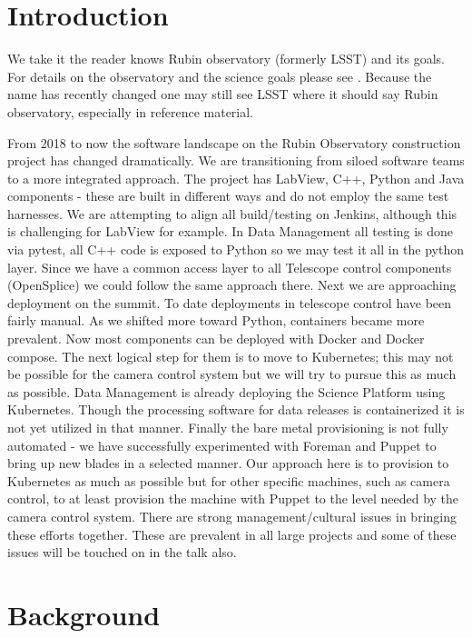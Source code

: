 \section{Introduction}

We take it the reader knows Rubin observatory (formerly LSST) and its goals. For details on the observatory and the science goals please see \cite{2008arXiv0805.2366I}. Because the name has recently changed one may still see LSST where it should say Rubin observatory, especially in reference material.

From 2018 to now  the software landscape on the Rubin Observatory construction project has changed dramatically.  We are transitioning from siloed software teams to a  more integrated approach.  The project has LabView, C++, Python and Java components - these are built in different ways and do not employ the same test harnesses. We are attempting to align all build/testing on Jenkins, although this is challenging for LabView for example. In Data Management all testing is done via pytest, all C++ code is exposed to Python so we may test it all in the python layer.  Since we have a common access layer to all Telescope control components (OpenSplice) we could follow the same approach there.
Next we are approaching deployment on the summit. To date deployments in telescope control have been fairly manual. As we shifted more toward Python, containers became more prevalent. Now most components can be deployed with Docker and Docker compose. The next logical step for them is to move to Kubernetes; this may not be possible for the camera control system but we will try to pursue this as much as possible. Data Management is already deploying the Science Platform using Kubernetes. Though the processing software for data releases is containerized it is not yet utilized in that manner.
Finally the bare metal provisioning is not fully automated - we have successfully experimented with Foreman and Puppet to bring up new blades in a selected manner. Our approach here is to provision to Kubernetes as much as possible but for other specific machines, such as camera control, to at least provision the machine with Puppet to the level needed by the camera control system.
There are strong management/cultural issues in bringing these efforts together. These are prevalent in all large projects and some of these issues will be touched on in the talk also.

\section{Background }\label{sect:back}

